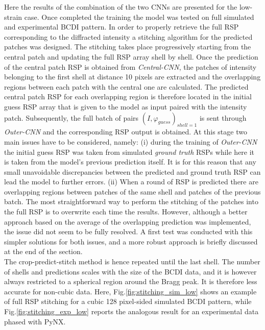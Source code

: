 Here the results of the combination of the two CNNs are presented for the low-strain case. Once completed the training 
the model was tested on full simulated and experimental BCDI pattern. In order to properly retrieve the full RSP corresponding 
to the diffracted intensity a stitching algorithm for the predicted patches was designed. The stitching takes place
progressively starting from the central patch and updating the full RSP array shell by shell. Once the prediction of the 
central patch RSP is obtained from \textit{Central-CNN}, the patches of intensity belonging to the first shell at distance 10 pixels 
are extracted and the overlapping regions between each patch with the central one are calculated. The predicted central patch RSP 
for each overlapping region is therefore located in the initial guess RSP array that is given to the model as input paired with 
the intensity patch. Subsequently, the full batch of pairs $(I,\varphi_{guess})_{shell = 1}$ is sent through 
\textit{Outer-CNN} and the corresponding RSP output is obtained. 
At this stage two main issues have to be considered, namely: (i) during the training of \textit{Outer-CNN}
the initial guess RSP was taken from simulated \textit{ground truth} RSPs while here it is taken from the model's 
previous prediction itself. It is for this reason that any small unavoidable discrepancies between the predicted and 
ground truth RSP can lead the model to further errors. (ii) When a round of RSP is predicted there are overlapping 
regions between patches of the same shell and patches of the previous batch. The most straightforward way to perform the 
stitching of the patches into the full RSP is to overwrite each time the results. However, although a better approach 
based on the average of the overlapping prediction was implemented, the issue did not seem to be fully resolved.
A first test was conducted with this simpler solutions for both issues, and a more robust approach is briefly discussed 
at the end of the section. \\

The crop-predict-stitch method is hence repeated until the last shell. The number of shells and predictions scales with 
the size of the BCDI data, and it is however always restricted to a spherical region around the Bragg peak. It is therefore 
less accurate for non-cubic data. 
Here, Fig.\ref{fig:stitching_sim_low} shows an example of full RSP stitching for a cubic 128 pixel-sided simulated BCDI 
pattern, while Fig.\ref{fig:stitching_exp_low} reports the analogous result for an experimental data phased with PyNX. 

